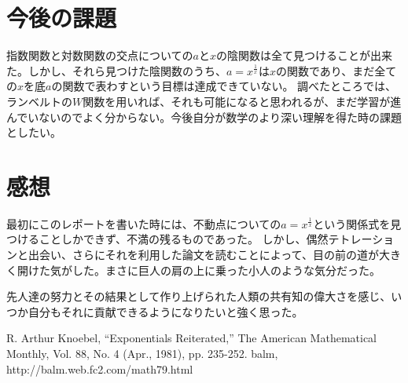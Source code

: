\section{今後の課題}

	指数関数と対数関数の交点についての$a$と$x$の陰関数は全て見つけることが出来た。しかし、それら見つけた陰関数のうち、$a=x^{\frac{1}{x}}$は$x$の関数であり、まだ全ての$x$を底$a$の関数で表わすという目標は達成できていない。
	調べたところでは、ランベルトの$W$関数を用いれば、それも可能になると思われるが、まだ学習が進んでいないのでよく分からない。今後自分が数学のより深い理解を得た時の課題としたい。
	
\section{感想}

	最初にこのレポートを書いた時には、不動点についての$a=x^{\frac{1}{x}}$という関係式を見つけることしかできず、不満の残るものであった。
	しかし、偶然テトレーションと出会い、さらにそれを利用した論文を読むことによって、目の前の道が大きく開けた気がした。まさに巨人の肩の上に乗った小人のような気分だった。
	
	先人達の努力とその結果として作り上げられた人類の共有知の偉大さを感じ、いつか自分もそれに貢献できるようになりたいと強く思った。
	
\begin{thebibliography}{9}
	 R. Arthur Knoebel, ``Exponentials Reiterated,'' The American Mathematical Monthly, Vol. 88, No. 4 (Apr., 1981), pp. 235-252.
	 balm, http://balm.web.fc2.com/math79.html
\end{thebibliography}
